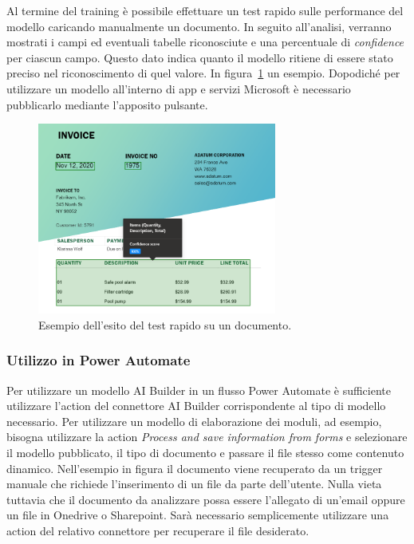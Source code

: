 Al termine del training è possibile effettuare un test rapido sulle performance del modello caricando manualmente un documento. In seguito all'analisi, verranno mostrati i campi ed eventuali tabelle riconosciute e una percentuale di \textit{confidence} per ciascun campo. Questo dato indica quanto il modello ritiene di essere stato preciso nel riconoscimento di quel valore. In figura~\ref{fig:aiBuilderTest} un esempio.
Dopodiché per utilizzare un modello all'interno di app e servizi Microsoft è necessario pubblicarlo mediante l'apposito pulsante.

\begin{figure}[ht!]
  \centering
  \includegraphics[width=0.7\textwidth]{ai-builder-test.png}
  \caption{Esempio dell'esito del test rapido su un documento.}
  \label{fig:aiBuilderTest}
\end{figure}

\subsubsection{Utilizzo in Power Automate}
Per utilizzare un modello AI Builder in un flusso Power Automate è sufficiente utilizzare l'action  del connettore AI Builder corrispondente al tipo di modello necessario. Per utilizzare un modello di elaborazione dei moduli, ad esempio, bisogna utilizzare la action \textit{Process and save information from forms} e selezionare il modello pubblicato, il tipo di documento e passare il file stesso come contenuto dinamico. Nell'esempio in figura il documento viene recuperato da un trigger manuale che richiede l'inserimento di un file da parte dell'utente. Nulla vieta tuttavia che il documento da analizzare possa essere l'allegato di un'email oppure un file in Onedrive o Sharepoint. Sarà necessario semplicemente utilizzare una action del relativo connettore per recuperare il file desiderato.

